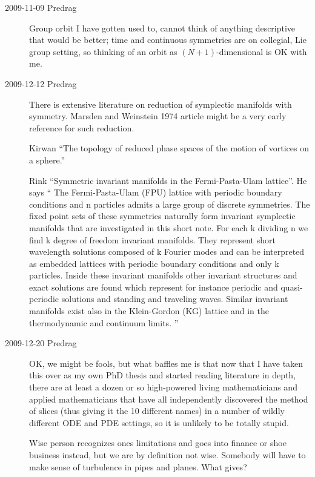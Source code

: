 \begin{description}
\item[2009-11-09 Predrag]
Group orbit I have gotten used to, cannot think of anything descriptive
that would be better; time and continuous symmetries are on collegial,
Lie group setting, so thinking of an orbit as $(N+1)$-dimensional is OK
with me.

\renewcommand{\LieEl}{\ensuremath{g}}  %
\renewcommand{\gSpace}{\ensuremath{\theta}}   %
\renewcommand{\ssp}{x}

\item[2009-12-12 Predrag]
There is extensive literature on reduction of symplectic manifolds with
symmetry.
Marsden and Weinstein 1974 article
might be a very early reference for such reduction.

Kirwan ``The topology of reduced phase spaces of
the motion of vortices on a sphere.''

 Rink
``Symmetric invariant manifolds in
  the  {Fermi-Pasta-Ulam} lattice''. He says ``
The Fermi-Pasta-Ulam (FPU) lattice with periodic boundary
conditions and n particles admits a large group of discrete
symmetries. The fixed point sets of these symmetries naturally
form invariant symplectic manifolds that are investigated in
this short note. For each k dividing n we find k degree of
freedom invariant manifolds. They represent short wavelength
solutions composed of k Fourier modes and can be interpreted as
embedded lattices with periodic boundary conditions and only k
particles. Inside these invariant manifolds other invariant
structures and exact solutions are found which represent for
instance periodic and quasi-periodic solutions and standing and
traveling waves. Similar invariant manifolds exist also in the
Klein-Gordon (KG) lattice and in the thermodynamic and
continuum limits.
''

\item[2009-12-20 Predrag]
	OK, we might be fools, but what baffles me is that now
that I have taken this over as my own PhD thesis and started
reading literature in depth, there are at least a dozen or so
high-powered living mathematicians and applied mathematicians
that have all independently discovered the method of slices
(thus giving it the 10 different names) in a number of wildly
different ODE and PDE settings, so it is unlikely to be
totally stupid.

Wise person recognizes ones limitations and goes into finance
or shoe business instead, but we are by definition not wise.
Somebody will have to make sense of turbulence in pipes and
planes. What gives?


\end{description}
